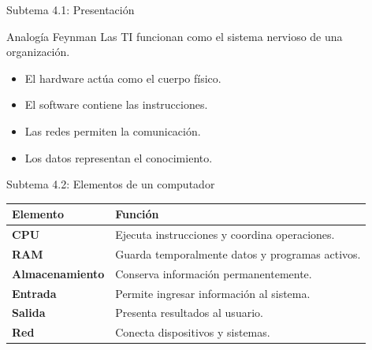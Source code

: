 \documentclass[10pt,aspectratio=169]{beamer}
\begin{document}
	\begin{frame}{Subtema 4.1: Presentación}
		
		\begin{block}{Analogía Feynman}
			Las TI funcionan como el sistema nervioso de una organización.
		\end{block}
		
		\begin{itemize}
			\item El hardware actúa como el cuerpo físico.
			\item El software contiene las instrucciones.
			\item Las redes permiten la comunicación.
			\item Los datos representan el conocimiento.
		\end{itemize}
		
	\end{frame}
	
	
	\begin{frame}{Subtema 4.2: Elementos de un computador}
		
		\small
		
		\begin{center}
			
			\begin{tabular}{>{\bfseries}p{3cm} p{8cm}}
				
				\toprule
				
				Elemento & Función \\
				
				\midrule
				
				CPU & Ejecuta instrucciones y coordina operaciones. \\
				
				RAM & Guarda temporalmente datos y programas activos. \\
				
				Almacenamiento & Conserva información permanentemente. \\
				
				Entrada & Permite ingresar información al sistema. \\
				
				Salida & Presenta resultados al usuario. \\
				
				Red & Conecta dispositivos y sistemas. \\
				
				\bottomrule
				
			\end{tabular}
			
		\end{center}
		
	\end{frame}
	
\end{document}
